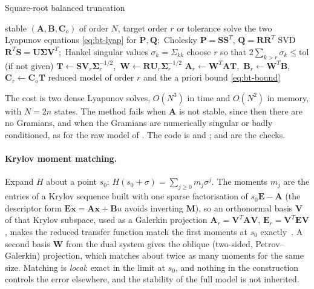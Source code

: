 \begin{algbox}{Square-root balanced truncation}
\begin{pseudo}
\Require stable $(\bm A,\bm B,\bm C_o)$ of order $N$, target order $r$ or tolerance
\State solve the two Lyapunov equations \eqref{eq:bt-lyap} for $\bm P,\bm Q$;\ Cholesky $\bm P=\bm S\bm S^T$, $\bm Q=\bm R\bm R^T$
\State SVD $\bm R^T\bm S=\bm U\bm\Sigma\bm V^T$;\ Hankel singular values $\sigma_k=\Sigma_{kk}$
\State choose $r$ so that $2\sum_{k>r}\sigma_k\le\mathrm{tol}$ (if not given)
\State $\bm T\gets\bm S\bm V_r\bm\Sigma_r^{-1/2}$,\ $\bm W\gets\bm R\bm U_r\bm\Sigma_r^{-1/2}$
\State $\bm A_r\gets\bm W^T\bm A\bm T$,\ $\bm B_r\gets\bm W^T\bm B$,\ $\bm C_r\gets\bm C_o\bm T$
\Ensure reduced model of order $r$ and the a priori bound \eqref{eq:bt-bound}
\end{pseudo}
\end{algbox}

The cost is two dense Lyapunov solves, $O(N^3)$ in time and $O(N^2)$ in memory, with $N=2n$ states. The method fails when $\bm A$ is not stable, since then there are no Gramians, and when the Gramians are numerically singular or badly conditioned, as for the raw model of . The code is  and ;  and  are the checks.

\paragraph{Krylov moment matching.}
Expand $H$ about a point $s_0$: $H(s_0+\sigma)=\sum_{j\ge0}m_j\sigma^j$. The moments $m_j$ are the entries of a Krylov sequence built with one sparse factorisation of $s_0\bm E-\bm A$ (the descriptor form $\bm E\dot{\bm x}=\bm A\bm x+\bm B u$ avoids inverting $\bm M$), so an orthonormal basis $\bm V$ of that Krylov subspace, used as a Galerkin projection $\bm A_r=\bm V^T\bm A\bm V$, $\bm E_r=\bm V^T\bm E\bm V$, makes the reduced transfer function match the first moments at $s_0$ exactly~\cite{besselink2013comparison}. A second basis $\bm W$ from the dual system gives the oblique (two-sided, Petrov--Galerkin) projection, which matches about twice as many moments for the same size. Matching is \emph{local}: exact in the limit at $s_0$, and nothing in the construction controls the error elsewhere, and the stability of the full model is not inherited.

